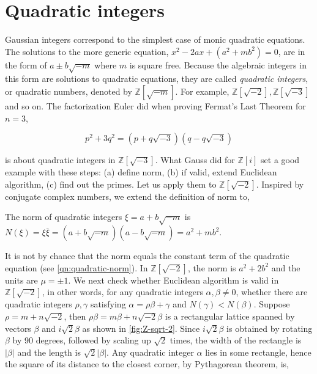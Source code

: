 \documentclass[b5paper]{article}
\begin{document}
\section{Quadratic integers}
 
Gaussian integers correspond to the simplest case of monic quadratic equations. The solutions to the more generic equation, $x^2 - 2ax + (a^2 + mb^2) = 0$, are in the form of $a \pm b\sqrt{-m}$ where $m$ is square free. Because the algebraic integers in this form are solutions to quadratic equations, they are called \emph{quadratic integers}, or quadratic numbers, denoted by $\mathbb{Z}[\sqrt{-m}]$. For example, $\mathbb{Z}[\sqrt{-2}], \mathbb{Z}[\sqrt{-3}]$ and so on. The factorization Euler did when proving Fermat's Last Theorem for $n=3$,

\[
p^2 + 3q^2 = (p + q\sqrt{-3})(q - q\sqrt{-3})
\]

is about quadratic integers in $\mathbb{Z}[\sqrt{-3}]$. What Gauss did for $\mathbb{Z}[i]$ set a good example with these steps: (a) define norm, (b) if valid, extend Euclidean algorithm, (c) find out the primes. Let us apply them to $\mathbb{Z}[\sqrt{-2}]$. Inspired by conjugate complex numbers, we extend the definition of norm to,

\begin{definition}
The norm of quadratic integers $\xi = a + b\sqrt{-m}$ is $N(\xi) = \xi\overline{\xi} = (a + b\sqrt{-m})(a - b\sqrt{-m}) = a^2 + mb^2$.
\end{definition}

It is not by chance that the norm equals the constant term of the quadratic equation (see \cref{qn:quadratic-norm}). In $\mathbb{Z}[\sqrt{-2}]$, the norm is $a^2 + 2b^2$ and the units are $\mu = \pm 1$. We next check whether Euclidean algorithm is valid in $\mathbb{Z}[\sqrt{-2}]$, in other words, for any quadratic integers $\alpha, \beta \ne 0$, whether there are quadratic integers $\rho, \gamma$ satisfying $\alpha = \rho \beta + \gamma$ and $N(\gamma) < N(\beta)$. Suppose $\rho = m + n\sqrt{-2}$, then $\rho \beta = m\beta + n\sqrt{-2}\beta$ is a rectangular lattice spanned by vectors $\beta$ and $i\sqrt{2}\beta$ as shown in \cref{fig:Z-sqrt-2}. Since $i\sqrt{2}\beta$ is obtained by rotating $\beta$ by 90 degrees, followed by scaling up $\sqrt{2}$ times, the width of the rectangle is $|\beta|$ and the length is $\sqrt{2}|\beta|$. Any quadratic integer $\alpha$ lies in some rectangle, hence the square of its distance to the closest corner, by Pythagorean theorem, is,
\end{document}

